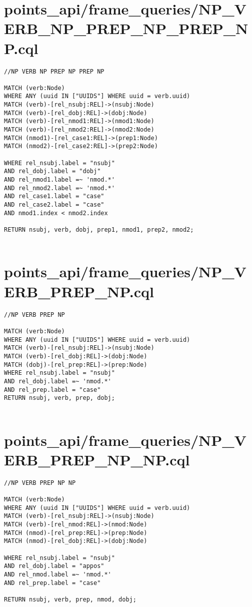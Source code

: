 \documentclass{article}
\begin{document}
\section*{points\_api/frame\_queries/NP\_VERB\_NP\_PREP\_NP\_PREP\_NP.cql}
\begin{verbatim}
//NP VERB NP PREP NP PREP NP

MATCH (verb:Node)
WHERE ANY (uuid IN ["UUIDS"] WHERE uuid = verb.uuid)
MATCH (verb)-[rel_nsubj:REL]->(nsubj:Node)
MATCH (verb)-[rel_dobj:REL]->(dobj:Node)
MATCH (verb)-[rel_nmod1:REL]->(nmod1:Node)
MATCH (verb)-[rel_nmod2:REL]->(nmod2:Node)
MATCH (nmod1)-[rel_case1:REL]->(prep1:Node)
MATCH (nmod2)-[rel_case2:REL]->(prep2:Node)

WHERE rel_nsubj.label = "nsubj"
AND rel_dobj.label = "dobj"
AND rel_nmod1.label =~ 'nmod.*'
AND rel_nmod2.label =~ 'nmod.*'
AND rel_case1.label = "case"
AND rel_case2.label = "case"
AND nmod1.index < nmod2.index

RETURN nsubj, verb, dobj, prep1, nmod1, prep2, nmod2;


\end{verbatim}
\pagebreak

\section*{points\_api/frame\_queries/NP\_VERB\_PREP\_NP.cql}
\begin{verbatim}
//NP VERB PREP NP

MATCH (verb:Node)
WHERE ANY (uuid IN ["UUIDS"] WHERE uuid = verb.uuid)
MATCH (verb)-[rel_nsubj:REL]->(nsubj:Node)
MATCH (verb)-[rel_dobj:REL]->(dobj:Node)
MATCH (dobj)-[rel_prep:REL]->(prep:Node)
WHERE rel_nsubj.label = "nsubj"
AND rel_dobj.label =~ 'nmod.*'
AND rel_prep.label = "case"
RETURN nsubj, verb, prep, dobj;


\end{verbatim}
\pagebreak

\section*{points\_api/frame\_queries/NP\_VERB\_PREP\_NP\_NP.cql}
\begin{verbatim}
//NP VERB PREP NP NP

MATCH (verb:Node)
WHERE ANY (uuid IN ["UUIDS"] WHERE uuid = verb.uuid)
MATCH (verb)-[rel_nsubj:REL]->(nsubj:Node)
MATCH (verb)-[rel_nmod:REL]->(nmod:Node)
MATCH (nmod)-[rel_prep:REL]->(prep:Node)
MATCH (nmod)-[rel_dobj:REL]->(dobj:Node)

WHERE rel_nsubj.label = "nsubj"
AND rel_dobj.label = "appos"
AND rel_nmod.label =~ 'nmod.*'
AND rel_prep.label = "case"

RETURN nsubj, verb, prep, nmod, dobj;


\end{verbatim}
\pagebreak
\end{document}

